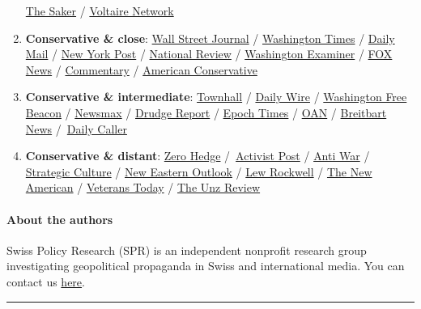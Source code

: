 \begin{enumerate}
  \href{http://thesaker.is/}{The Saker} /
  \href{https://www.voltairenet.org/en}{Voltaire Network}
\item
  \textbf{Conservative \& close}: \href{https://www.wsj.com/}{Wall
  Street Journal} / \href{https://www.washingtontimes.com/}{Washington
  Times} / \href{https://www.dailymail.co.uk/}{Daily Mail} /
  \href{https://nypost.com/}{New York Post} /
  \href{https://www.nationalreview.com/}{National Review} /
  \href{https://www.washingtonexaminer.com/}{Washington Examiner} /
  \href{https://www.foxnews.com/}{FOX News} /
  \href{https://www.commentarymagazine.com/}{Commentary} /
  \href{https://www.theamericanconservative.com/}{American Conservative}
\item
  \textbf{Conservative \& intermediate}:
  \href{https://townhall.com/}{Townhall} /
  \href{https://www.dailywire.com/}{Daily Wire} /
  \href{https://freebeacon.com/}{Washington Free Beacon} /
  \href{https://www.newsmax.com/}{Newsmax} /
  \href{https://drudgereport.com/}{Drudge Report} /
  \href{https://www.theepochtimes.com/}{Epoch Times} /
  \href{https://www.oann.com/}{OAN} /
  \href{https://www.breitbart.com/}{Breitbart News}
  /~\href{https://dailycaller.com/}{Daily Caller}
\item
  \textbf{Conservative \& distant}:
  \href{https://www.zerohedge.com/}{Zero Hedge}
  /~\href{https://www.activistpost.com/}{Activist Post} /
  \href{https://www.antiwar.com/}{Anti War} /
  \href{https://www.strategic-culture.org/}{Strategic Culture} /
  \href{https://journal-neo.org/}{New Eastern Outlook} /
  \href{https://www.lewrockwell.com/}{Lew Rockwell} /
  \href{https://www.thenewamerican.com/}{The New American} /
  \href{https://www.veteranstoday.com/}{Veterans Today} /
  \href{https://www.unz.com/}{The Unz Review}
\end{enumerate}

\hypertarget{about-the-authors}{%
\paragraph{About the authors}\label{about-the-authors}}

Swiss Policy Research (SPR) is an independent nonprofit research group
investigating geopolitical propaganda in Swiss and international media.
You can contact us \href{https://swprs.org/contact/}{here}.

\begin{center}\rule{0.5\linewidth}{\linethickness}\end{center}

